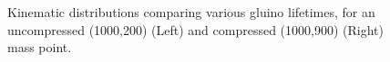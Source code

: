 \begin{figure}[h!]
\begin{center}
     \\
     ~
    \caption{Kinematic distributions comparing various gluino
      lifetimes, for an uncompressed (1000,200) (Left) and compressed
      (1000,900) (Right) mass point.}
    \label{fig:T1qqqqLLvsT1qqqqLL}
  \end{center}
\end{figure}

